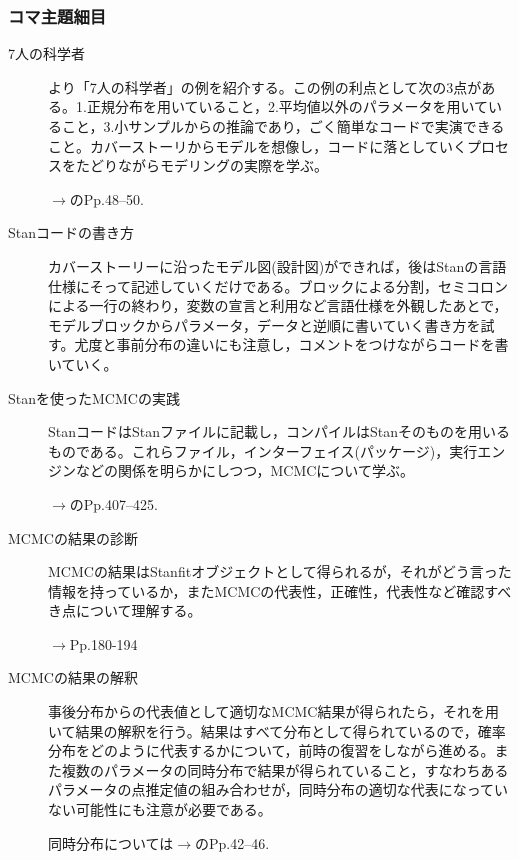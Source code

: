 \subsubsection{コマ主題細目}
\begin{description}
	\item[7人の科学者] \textcite{Lee201709}より「7人の科学者」の例を紹介する。この例の利点として次の3点がある。1.正規分布を用いていること，2.平均値以外のパラメータを用いていること，3.小サンプルからの推論であり，ごく簡単なコードで実演できること。カバーストーリからモデルを想像し，コードに落としていくプロセスをたどりながらモデリングの実際を学ぶ。
	      \begin{flushright}
		      $\to$\textcite{Lee201709}のPp.48--50.
	      \end{flushright}
	\item[Stanコードの書き方] カバーストーリーに沿ったモデル図(設計図)ができれば，後はStanの言語仕様にそって記述していくだけである。ブロックによる分割，セミコロンによる一行の終わり，変数の宣言と利用など言語仕様を外観したあとで，モデルブロックからパラメータ，データと逆順に書いていく書き方を試す。尤度と事前分布の違いにも注意し，コメントをつけながらコードを書いていく。

	\item[Stanを使ったMCMCの実践] StanコードはStanファイルに記載し，コンパイルはStanそのものを用いるものである。これらファイル，インターフェイス(パッケージ)，実行エンジンなどの関係を明らかにしつつ，MCMCについて学ぶ。

	      \begin{flushright}
		      $\to$\textcite{Maeda2017}のPp.407--425.
	      \end{flushright}


	\item[MCMCの結果の診断] MCMCの結果はStanfitオブジェクトとして得られるが，それがどう言った情報を持っているか，またMCMCの代表性，正確性，代表性など確認すべき点について理解する。

	      \begin{flushright}
		      $\to$\textcite{Maeda2017}Pp.180-194
	      \end{flushright}

	\item[MCMCの結果の解釈] 事後分布からの代表値として適切なMCMC結果が得られたら，それを用いて結果の解釈を行う。結果はすべて分布として得られているので，確率分布をどのように代表するかについて，前時の復習をしながら進める。また複数のパラメータの同時分布で結果が得られていること，すなわちあるパラメータの点推定値の組み合わせが，同時分布の適切な代表になっていない可能性にも注意が必要である。

	      \begin{flushright}
		      同時分布については$\to$\textcite{Lee201709}のPp.42--46.
	      \end{flushright}
\end{description}
